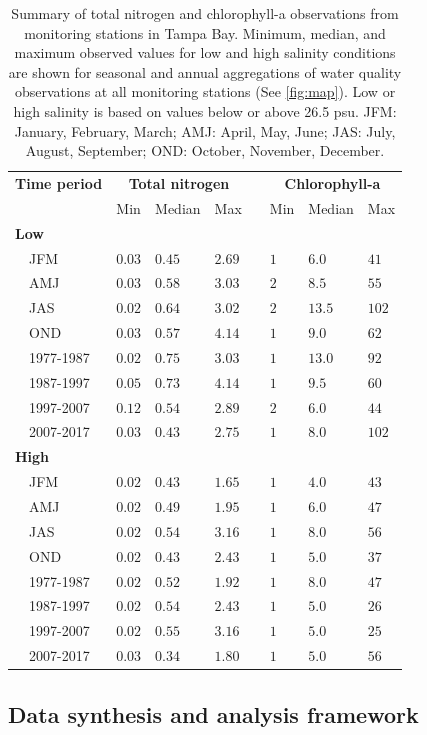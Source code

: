 \documentclass[]{article}
\begin{document}
\begin{table}[!tbp]
\caption{Summary of total nitrogen and chlorophyll-a observations from monitoring stations in Tampa Bay.  Minimum, median, and maximum observed values for low and high salinity conditions are shown for seasonal and annual aggregations of water quality observations at all monitoring stations (See \cref{fig:map}).  Low or high salinity is based on values below or above 26.5 psu. JFM: January, February, March; AMJ: April, May, June; JAS: July, August, September; OND: October, November, December.\label{tab:statsum}} 
\begin{center}
\begin{tabular}{llllclll}
\hline\hline
\multicolumn{1}{l}{\bfseries Time period}&\multicolumn{3}{c}{\bfseries Total nitrogen}&\multicolumn{1}{c}{\bfseries }&\multicolumn{3}{c}{\bfseries Chlorophyll-a}\tabularnewline
\cline{2-4} \cline{6-8}
\multicolumn{1}{l}{}&\multicolumn{1}{c}{Min}&\multicolumn{1}{c}{Median}&\multicolumn{1}{c}{Max}&\multicolumn{1}{c}{}&\multicolumn{1}{c}{Min}&\multicolumn{1}{c}{Median}&\multicolumn{1}{c}{Max}\tabularnewline
\hline
{\bfseries Low}&&&&&&&\tabularnewline
~~JFM&$0.03$&$0.45$&$2.69$&&$1$&$ 6.0$&$ 41$\tabularnewline
~~AMJ&$0.03$&$0.58$&$3.03$&&$2$&$ 8.5$&$ 55$\tabularnewline
~~JAS&$0.02$&$0.64$&$3.02$&&$2$&$13.5$&$102$\tabularnewline
~~OND&$0.03$&$0.57$&$4.14$&&$1$&$ 9.0$&$ 62$\tabularnewline
~~1977-1987&$0.02$&$0.75$&$3.03$&&$1$&$13.0$&$ 92$\tabularnewline
~~1987-1997&$0.05$&$0.73$&$4.14$&&$1$&$ 9.5$&$ 60$\tabularnewline
~~1997-2007&$0.12$&$0.54$&$2.89$&&$2$&$ 6.0$&$ 44$\tabularnewline
~~2007-2017&$0.03$&$0.43$&$2.75$&&$1$&$ 8.0$&$102$\tabularnewline
\hline
{\bfseries High}&&&&&&&\tabularnewline
~~JFM&$0.02$&$0.43$&$1.65$&&$1$&$ 4.0$&$ 43$\tabularnewline
~~AMJ&$0.02$&$0.49$&$1.95$&&$1$&$ 6.0$&$ 47$\tabularnewline
~~JAS&$0.02$&$0.54$&$3.16$&&$1$&$ 8.0$&$ 56$\tabularnewline
~~OND&$0.02$&$0.43$&$2.43$&&$1$&$ 5.0$&$ 37$\tabularnewline
~~1977-1987&$0.02$&$0.52$&$1.92$&&$1$&$ 8.0$&$ 47$\tabularnewline
~~1987-1997&$0.02$&$0.54$&$2.43$&&$1$&$ 5.0$&$ 26$\tabularnewline
~~1997-2007&$0.02$&$0.55$&$3.16$&&$1$&$ 5.0$&$ 25$\tabularnewline
~~2007-2017&$0.03$&$0.34$&$1.80$&&$1$&$ 5.0$&$ 56$\tabularnewline
\hline
\end{tabular}\end{center}
\end{table}

\subsection{Data synthesis and analysis
framework}\label{data-synthesis-and-analysis-framework}
\end{document}
